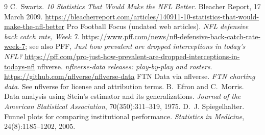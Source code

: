 \documentclass[11pt]{article}
\begin{document}
\begin{thebibliography}{9}
 C.~Swartz. \emph{10 Statistics That Would Make the NFL Better}. Bleacher Report, 17 March 2009. \url{https://bleacherreport.com/articles/140911-10-statistics-that-would-make-the-nfl-better}
 Pro Football Focus (undated web articles). \emph{NFL defensive back catch rate, Week 7}. \url{https://www.pff.com/news/nfl-defensive-back-catch-rate-week-7}; see also PFF, \emph{Just how prevalent are dropped interceptions in today's NFL?} \url{https://pff.com/pro-just-how-prevalent-are-dropped-interceptions-in-todays-nfl}
 nflverse. \emph{nflverse-data releases: play-by-play and rosters}. \url{https://github.com/nflverse/nflverse-data}
 FTN Data via nflverse. \emph{FTN charting data}. See nflverse for license and attribution terms.
 B.~Efron and C.~Morris. Data analysis using Stein's estimator and its generalizations. \emph{Journal of the American Statistical Association}, 70(350):311--319, 1975.
 D.~J. Spiegelhalter. Funnel plots for comparing institutional performance. \emph{Statistics in Medicine}, 24(8):1185--1202, 2005.
\end{thebibliography}
\end{document}
